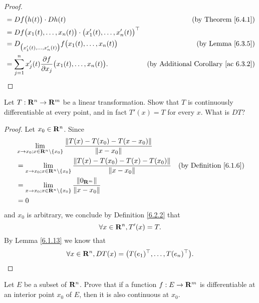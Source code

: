 \begin{proof}
\begin{align*}
                          & = D f\big(h(t)\big) \cdot D h(t)                                                         & \text{(by Theorem \ref{6.4.1})}                 \\
                          & = D f\big(x_1(t), \dots, x_n(t)\big) \cdot \big(x_1'(t), \dots, x_n'(t)\big)^\top                                                          \\
                          & = D_{\big(x_1'(t), \dots, x_n'(t)\big)} f\big(x_1(t), \dots, x_n(t)\big)                 & \text{(by Lemma \ref{6.3.5})}                   \\
                          & = \sum_{j = 1}^n x_j'(t) \frac{\partial f}{\partial x_j}\big(x_1(t), \dots, x_n(t)\big). & \text{(by Additional Corollary \ref{ac 6.3.2})}
    \end{align*}
\end{proof}

\exercisesection

\begin{exercise}\label{ex 6.4.1}
    Let \(T : \R^n \to \R^m\) be a linear transformation.
    Show that \(T\) is continuously differentiable at every point, and in fact \(T'(x) = T\) for every \(x\).
    What is \(D T\)?
\end{exercise}

\begin{proof}
    Let \(x_0 \in \R^n\).
    Since
    \begin{align*}
         & \lim_{x \to x_0 ; x \in \R^n \setminus \{x_0\}} \frac{\norm*{T(x) - T(x_0) - T(x - x_0)}}{\norm*{x - x_0}}                                           \\
         & = \lim_{x \to x_0 ; x \in \R^n \setminus \{x_0\}} \frac{\norm*{T(x) - T(x_0) - T(x) - T(x_0)}}{\norm*{x - x_0}} & \text{(by Definition \ref{6.1.6})} \\
         & = \lim_{x \to x_0 ; x \in \R^n \setminus \{x_0\}} \frac{\norm*{0_{\R^m}}}{\norm*{x - x_0}}                                                           \\
         & = 0
    \end{align*}
    and \(x_0\) is arbitrary, we conclude by Definition \ref{6.2.2} that
    \[
        \forall x \in \R^n, T'(x) = T.
    \]
    By Lemma \ref{6.1.13} we know that
    \[
        \forall x \in \R^n, D T(x) = \big(T(e_1)^\top, \dots, T(e_n)^\top\big).
    \]
\end{proof}

\begin{exercise}\label{ex 6.4.2}
    Let \(E\) be a subset of \(\R^n\).
    Prove that if a function \(f : E \to \R^m\) is differentiable at an interior point \(x_0\) of \(E\), then it is also continuous at \(x_0\).
\end{exercise}


